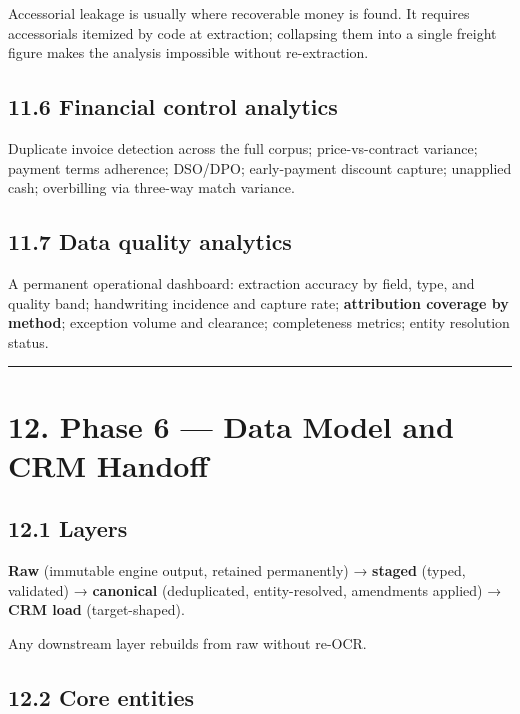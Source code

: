 \documentclass[
]{article}
\begin{document}
Accessorial leakage is usually where recoverable money is found. It
requires accessorials itemized by code at extraction; collapsing them
into a single freight figure makes the analysis impossible without
re-extraction.

\subsection{11.6 Financial control
analytics}\label{financial-control-analytics}

Duplicate invoice detection across the full corpus; price-vs-contract
variance; payment terms adherence; DSO/DPO; early-payment discount
capture; unapplied cash; overbilling via three-way match variance.

\subsection{11.7 Data quality analytics}\label{data-quality-analytics}

A permanent operational dashboard: extraction accuracy by field, type,
and quality band; handwriting incidence and capture rate;
\textbf{attribution coverage by method}; exception volume and clearance;
completeness metrics; entity resolution status.

\begin{center}\rule{0.5\linewidth}{0.5pt}\end{center}

\section{12. Phase 6 --- Data Model and CRM
Handoff}\label{phase-6-data-model-and-crm-handoff}

\subsection{12.1 Layers}\label{layers}

\textbf{Raw} (immutable engine output, retained permanently) →
\textbf{staged} (typed, validated) → \textbf{canonical} (deduplicated,
entity-resolved, amendments applied) → \textbf{CRM load}
(target-shaped).

Any downstream layer rebuilds from raw without re-OCR.

\subsection{12.2 Core entities}\label{core-entities}
\end{document}
